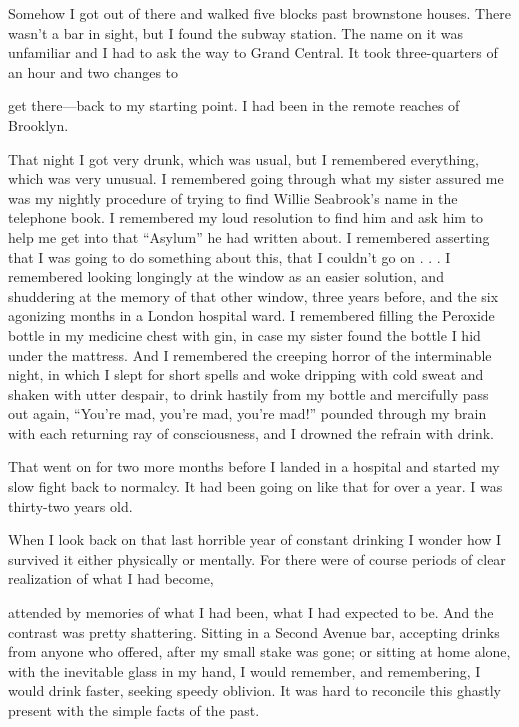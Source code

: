 \begin{biblechapter}
Somehow I got out of there and walked five blocks past brownstone houses. There wasn’t a bar in sight, but I found the subway station. The name on it was unfamiliar and I had to ask the way to Grand Central. It took three-quarters of an hour and two changes to

get there—back to my starting point. I had been in the remote reaches of Brooklyn.

That night I got very drunk, which was usual, but I remembered everything, which was very unusual. I remembered going through what my sister assured me was my nightly procedure of trying to find Willie Seabrook’s name in the telephone book. I remembered my loud resolution to find him and ask him to help me get into that “Asylum” he had written about. I remembered asserting that I was going to do something about this, that I couldn’t go on . . . I remembered looking longingly at the window as an easier solution, and shuddering at the memory of that other window, three years before, and the six agonizing months in a London hospital ward. I remembered filling the Peroxide bottle in my medicine chest with gin, in case my sister found the bottle I hid under the mattress. And I remembered the creeping horror of the interminable night, in which I slept for short spells and woke dripping with cold sweat and shaken with utter despair, to drink hastily from my bottle and mercifully pass out again, “You’re mad, you’re mad, you’re mad!” pounded through my brain with each returning ray of consciousness, and I drowned the refrain with drink.

That went on for two more months before I landed in a hospital and started my slow fight back to normalcy. It had been going on like that for over a year. I was thirty-two years old.

When I look back on that last horrible year of constant drinking I wonder how I survived it either physically or mentally. For there were of course periods of clear realization of what I had become,

attended by memories of what I had been, what I had expected to be. And the contrast was pretty shattering. Sitting in a Second Avenue bar, accepting drinks from anyone who offered, after my small stake was gone; or sitting at home alone, with the inevitable glass in my hand, I would remember, and remembering, I would drink faster, seeking speedy oblivion. It was hard to reconcile this ghastly present with the simple facts of the past.


\end{biblechapter}
